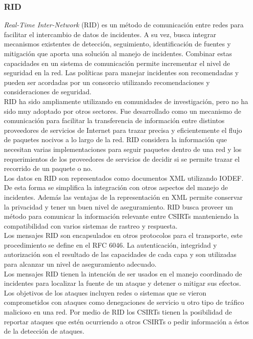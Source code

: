 \subsubsection{RID}

\textit{Real-Time Inter-Network} (RID) es un método de comunicación entre redes para 
facilitar el intercambio de datos de incidentes. A su vez, busca integrar 
mecanismos existentes de detección, seguimiento, identificación de fuentes y 
mitigación que aporta una solución al manejo de incidentes. Combinar estas 
capacidades en un sistema de comunicación permite incrementar el nivel de 
seguridad en la red. Las políticas para manejar incidentes son recomendadas y 
pueden ser acordadas por un consorcio utilizando recomendaciones y 
consideraciones de seguridad.\\

RID ha sido ampliamente utilizando en comunidades de investigación, pero no ha 
sido muy adoptado por otros sectores. Fue desarrollado como un mecanismo de 
comunicación para facilitar la transferencia de información entre distintos 
proveedores de servicios de Internet para trazar precisa y eficientemente el 
flujo de paquetes nocivos a lo largo de la red. RID considera la información que 
necesitan varias implementaciones para seguir paquetes dentro de una red y los 
requerimientos de los proveedores de servicios de decidir si se permite trazar 
el recorrido de un paquete o no.\\

Los datos en RID son representados como documentos XML utilizando IODEF. De esta 
forma se simplifica la integración con otros aspectos del manejo de incidentes. 
Además las ventajas de la representación en XML permite conservar la privacidad 
y tener un buen nivel de aseguramiento. RID busca proveer un método para 
comunicar la información relevante entre CSIRTs manteniendo la compatibilidad 
con varios sistemas de rastreo y respuesta.\\

Los mensajes RID son encapsulados en otros protocolos para el transporte, este 
procedimiento se define en el RFC 6046. La autenticación, integridad y 
autorización son el resultado de las capacidades de cada capa y son utilizadas 
para alcanzar un nivel de aseguramiento adecuado.\\

Los mensajes RID tienen la intención de ser usados en el manejo coordinado de 
incidentes para localizar la fuente de un ataque y detener o mitigar sus 
efectos. Los objetivos de los ataques incluyen redes o sistemas que se vieron 
comprometidos con ataques como denegaciones de servicio u otro tipo de tráfico 
malicioso en una red. Por medio de RID los CSIRTs tienen la posibilidad de 
reportar ataques que estén ocurriendo a otros CSIRTs o pedir información a éstos 
de la detección de ataques.\\

